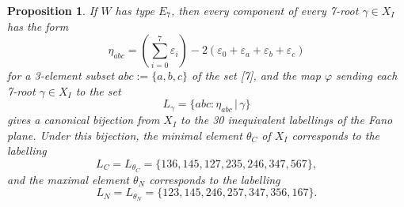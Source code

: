 \documentclass[11pt]{amsart}
\theoremstyle{plain}
\newtheorem{prop}[theorem]{Proposition}
\theoremstyle{definition}
\theoremstyle{remark}
\numberwithin{equation}{subsection}
\newcommand{\ep}{\varepsilon}
\begin{document}
\begin{prop}\label{prop:e7top}
If $W$ has type $E_7$, then every component of every 7-root $\gamma\in X_I$ has
the form \[ \eta_{abc}= \left( \sum_{i = 0}^7 \ep_i \right) - 2 (\ep_0 + \ep_a +
\ep_b + \ep_c) \] for a 3-element subset $abc:=\{a,b,c\}$ of the set [7], and
the map $\varphi$ sending each 7-root $\gamma\in X_I$ to the set
\[L_\gamma=\{abc: \eta_{abc} \,\vert\,\gamma\} \] gives a canonical bijection
from $X_I$ to the 30 inequivalent labellings of the Fano plane.  Under this
bijection, the  minimal element $\theta_C$ of $X_I$ corresponds to the labelling
$$ L_C=L_{\theta_C}=\{136, 145, 127, 235, 246, 347, 567\} ,$$ and the maximal
element $\theta_N$ corresponds to the labelling $$ L_N=L_{\theta_N}=\{123, 145,
246, 257, 347, 356, 167\} .$$
\end{prop}
\end{document}
